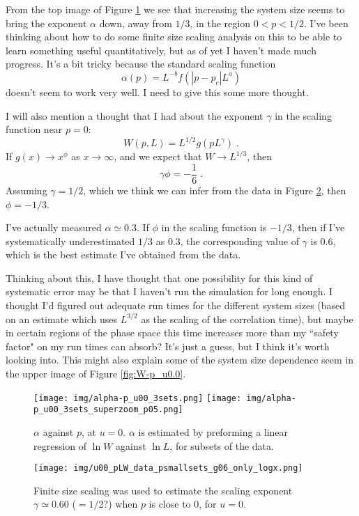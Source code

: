 \documentclass[a4paper,10pt]{article}
\newcommand{\fref}[1]{Figure \ref{#1}}
\begin{document}
From the top image of \fref{fig:alpha-p} we see that increasing the system size seems to bring the exponent $\alpha$ down, away from $1/3$, in the region $0<p<1/2$. I've been thinking about how to do some finite size scaling analysis on this to be able to learn something useful quantitatively, but as of yet I haven't made much progress. It's a bit tricky because the standard scaling function
\begin{equation}
 \alpha(p) = L^{-b} f( |p-p_c|L^{a})
\end{equation}
doesn't seem to work very well. I need to give this some more thought.

I will also mention a thought that I had about the exponent $\gamma$ in the scaling function near $p=0$:
\begin{equation}
 W(p,L) = L^{1/2}g(pL^\gamma) \;.
\end{equation}
If $g(x)\to x^{\phi}$ as $x\to\infty$, and we expect that $W\to L^{1/3}$, then 
\begin{equation}
 \gamma\phi = -\frac{1}{6} \;.
\end{equation}
Assuming $\gamma = 1/2$, which we think we can infer from the data in \fref{fig:u0_g0.6}, then $\phi = -1/3$.

I've actually measured $\alpha \simeq 0.3$. If $\phi$ in the scaling function is $-1/3$, then if I've systematically underestimated $1/3$ as $0.3$, the corresponding value of $\gamma$ is $0.6$, which is the best estimate I've obtained from the data. 

Thinking about this, I have thought that one possibility for this kind of systematic error may be that I haven't run the simulation for long enough. I thought I'd figured out adequate run times for the different system sizes (based on an estimate which uses $L^{3/2}$ as the scaling of the correlation time), but maybe in certain regions of the phase space this time increases more than my ``safety factor" on my run times can absorb? It's just a guess, but I think it's worth looking into. This might also explain some of the system size dependence seem in the upper image of \fref{fig:W-p_u0.0}.

\begin{figure}
 \centering
 \texttt{[image: img/alpha-p\_u00\_3sets.png]}
 \texttt{[image: img/alpha-p\_u00\_3sets\_superzoom\_p05.png]}
 \caption{$\alpha$ against $p$, at $u=0$. $\alpha$ is estimated by preforming a linear regression of $\ln W$ against $\ln L$, for subsets of the data.}
 \label{fig:alpha-p}
\end{figure}

\begin{figure}
 \centering
 \texttt{[image: img/u00\_pLW\_data\_psmallsets\_g06\_only\_logx.png]}
 \caption{Finite size scaling was used to estimate the scaling exponent $\gamma\simeq0.60$ ($=1/2$?) when $p$ is close to $0$, for $u=0$.}
 \label{fig:u0_g0.6}
\end{figure}
\end{document}
